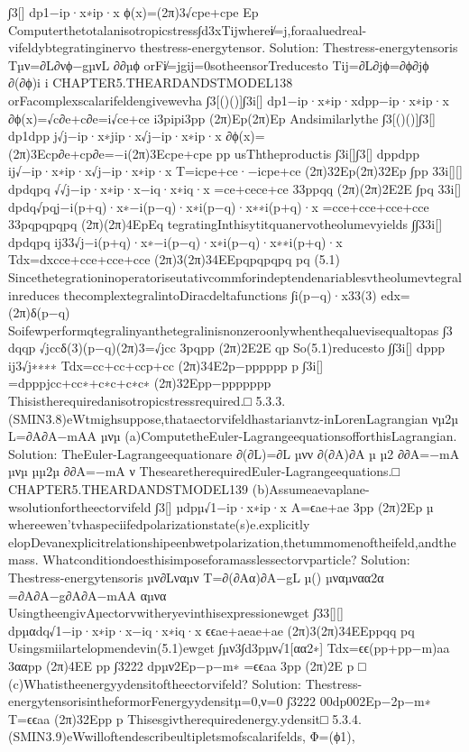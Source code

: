 {{{{{{{{{{∫3[]
dp1−ip·x∗ip·x
ϕ(x)=(2π)3√cpe+cpe
Ep
Computerthetotalanisotropicstress∫d3xTijwherei̸=j,foraaluedreal-vifeldybtegratinginervo
thestress-energytensor.
Solution:
Thestress-energytensoris
Tµν=∂L∂νϕ−gµνL
∂∂µϕ
orFi̸=jgij=0sotheensorTreducesto
Tij=∂L∂jϕ=∂ϕ∂jϕ
∂(∂ϕ)i
i
CHAPTER5.THEARDANDSTMODEL138
orFacomplexscalarifeldengivewevha
∫3[()()]∫3i[]
dp1−ip·x∗ip·xdpp−ip·x∗ip·x
∂ϕ(x)=√c∂e+c∂e=i√ce+ce
i3pipi3pp
(2π)Ep(2π)Ep
Andsimilarlythe
∫3[()()]∫3[]
dp1dpp
j√j−ip·x∗jip·x√j−ip·x∗ip·x
∂ϕ(x)=(2π)3Ecp∂e+cp∂e=−i(2π)3Ecpe+cpe
pp
usThtheproductis
∫3i[]∫3[]
dppdpp
ij√−ip·x∗ip·x√j−ip·x∗ip·x
T=icpe+ce·−icpe+ce
(2π)32Ep(2π)32Ep
∫pp
33i[][]
dpdqpq
√√j−ip·x∗ip·x−iq·x∗iq·x
=ce+cece+ce
33ppqq
(2π)(2π)2E2E
∫pq
33i[]
dpdq√pqj−i(p+q)·x∗−i(p−q)·x∗i(p−q)·x∗∗i(p+q)·x
=cce+cce+cce+cce
33pqpqpqpq
(2π)(2π)4EpEq
tegratingInthisytitquanervotheolumevyields
∫∫33i[]
dpdqpq
ij33√j−i(p+q)·x∗−i(p−q)·x∗i(p−q)·x∗∗i(p+q)·x
Tdx=dxcce+cce+cce+cce
(2π)3(2π)34EEpqpqpqpq
pq
(5.1)
Sincethetegrationinoperatoriseutativcommforindeptendenariablesvtheolumevtegralinreduces
thecomplextegralintoDiracdeltafunctions
∫i(p−q)·x33(3)
edx=(2π)δ(p−q)
Soifewperformqtegralinyanthetegralinisnonzeroonlywhentheqaluevisequaltopas
∫3
dqqp
√jccδ(3)(p−q)(2π)3=√jcc
3pqpp
(2π)2E2E
qp
So(5.1)reducesto
∫∫3i[]
dppp
ij3√j∗∗∗∗
Tdx=cc+cc+ccp+cc
(2π)34E2p−pppppp
p
∫3i[]
=dpppjcc+cc∗+c∗c+c∗c∗
(2π)32Epp−ppppppp
Thisistherequiredanisotropicstressrequired.□
5.3.3.(SMIN3.8)eWtmighsuppose,thataectorvifeldhastarianvtz-inLorenLagrangian
νµ2µ
L=∂A∂A−mAA
µνµ
(a)ComputetheEuler-LagrangeequationsofforthisLagrangian.
Solution:
TheEuler-Lagrangeequationare
∂(∂L)=∂L
µνν
∂(∂A)∂A
µ
µ2
∂∂A=−mA
µνµ
µµ2µ
∂∂A=−mA
ν
ThesearetherequiredEuler-Lagrangeequations.□
CHAPTER5.THEARDANDSTMODEL139
(b)Assumeaevaplane-wsolutionfortheectorvifeld
∫3[]
µdpµ√1−ip·x∗ip·x
A=ϵae+ae
3pp
(2π)2Ep
µ
whereewen’tvhaspeciifedpolarizationstate(s)e.explicitly
elopDevanexplicitrelationshipeenbwetpolarization,thetummomenoftheifeld,andthemass.
Whatconditiondoesthisimposeforamasslessectorvparticle?
Solution:
Thestress-energytensoris
µν∂Lναµν
T=∂(∂Aα)∂A−gL
µ()
µναµναα2α
=∂A∂A−g∂A∂A−mAA
αµνα
UsingtheengivAµectorvwitheryevinthisexpressionewget
∫33[][]
dpµαdq√1−ip·x∗ip·x−iq·x∗iq·x
ϵϵae+aeae+ae
(2π)3(2π)34EEppqq
pq
Usingsmiilartelopmendevin(5.1)ewget
∫µν3∫d3pµν√1[αα2∗]
Tdx=ϵϵ(pp+pp−m)aa
3ααpp
(2π)4EE
pp
∫3222
dpµν2Ep−p−m∗
=ϵϵaa
3pp
(2π)2E
p
□
(c)Whatistheenergyydensitoftheectorvifeld?
Solution:
Thestress-energytensorisintheformorFenergyydensitµ=0,ν=0
∫3222
00dp002Ep−2p−m∗
T=ϵϵaa
(2π)32Epp
p
Thisesgivtherequiredenergy.ydensit□
5.3.4.(SMIN3.9)eWwilloftendescribeultipletsmofscalarifelds,
Φ=(ϕ1),
}}}}}}}}}}

